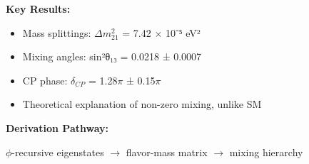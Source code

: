 \textbf{Key Results:}
\begin{itemize}
    \item Mass splittings: $\Delta m^2_{21}$ = 7.42 $\times$ 10⁻⁵ eV²
    \item Mixing angles: sin²θ₁₃ = 0.0218 ± 0.0007
    \item CP phase: $\delta_{CP}$ = 1.28$\pi$ ± 0.15$\pi$
    \item Theoretical explanation of non-zero mixing, unlike SM
\end{itemize}

\textbf{Derivation Pathway:}

$\phi$-recursive eigenstates $\to$ flavor-mass matrix $\to$ mixing hierarchy